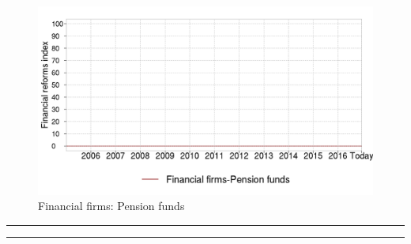 \documentclass[a4paper,12pt,leqno]{article}
\makeatletter
\renewenvironment{titlepage}
{%
  \cleardoublepage
  \if@twocolumn
  \@restonecoltrue\onecolumn
  \else
  \@restonecolfalse\newpage
  \fi
  \thispagestyle{empty}%
}%
{\if@restonecol\twocolumn \else \newpage \fi
}
\renewenvironment{titlepage}
{%
  \cleardoublepage
  \if@twocolumn
  \@restonecoltrue\onecolumn
  \else
  \@restonecolfalse\newpage
  \fi
  \thispagestyle{empty}%
}%
{\if@restonecol\twocolumn \else \newpage \fi
  \if@twoside\else
  \fi
}
\newlength{\textwidthorig}
\makeatother
\begin{document}
\begin{figure}[H]
  \caption{Financial firms: Pension funds}
  \centering
  \includegraphics[width=0.65\paperwidth,height=0.45\paperwidth]{../GRAPHS/frm_index_financial_firms_pension_funds.png}
\end{figure}

\begin{titlepage}

  \parbox{\textwidthorig}{
  \hrule
  \vspace{\baselineskip} 
  \vspace{\baselineskip}
  \hrule
  }

  \parbox{\textwidthorig}{
}
\end{titlepage}

\begin{table} [H]
  \caption{Section index: Financial firms}
  \begin{threeparttable}
    \begin{footnotesize}
    \end{footnotesize}
  \end{threeparttable}
\end{table}
\end{document}
